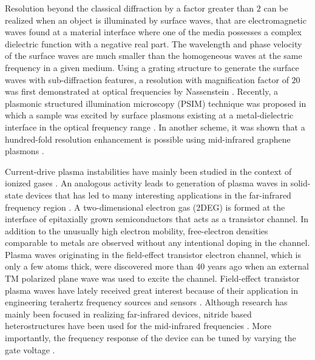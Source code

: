 \documentclass[10pt]{article}
\renewcommand{\^}{\hat}  %
\renewcommand{\^}{\hat}  %
\begin{document}
Resolution beyond the classical diffraction by a factor greater than $2$ can be realized when an object is illuminated by surface waves, that are electromagnetic waves found at a material interface where one of the media possesses a complex dielectric function with a negative real part. The wavelength and phase velocity of the surface waves are much smaller than the homogeneous waves at the same frequency in a given medium. Using a grating structure to generate the surface waves with sub-diffraction features, a resolution with magnification factor of $20$ was first demonstrated at optical frequencies by Nassenstein \cite{Nassenstein1970}. Recently, a plasmonic structured illumination microscopy (PSIM) technique was proposed in which a sample was excited by surface plasmons existing at a metal-dielectric interface in the optical frequency range \cite{Wei2010}. In another scheme, it was shown that a hundred-fold resolution enhancement is possible using mid-infrared
graphene plasmons \cite{Zeng2014,Zeng2017}.

Current-drive plasma instabilities have mainly been studied in the context of ionized gases \cite{9781489947871}.  An analogous activity leads to generation  of plasma waves in solid-state devices \cite{Kempa1991} that has led to many interesting applications in the far-infrared frequency region \cite{Dyer_2016, Wu2015}. A two-dimensional electron gas (2DEG) is formed at the interface of epitaxially grown semiconductors that acts as a transistor channel. In addition to the unusually high electron mobility, free-electron densities comparable to metals are observed without any intentional doping in the channel. Plasma waves originating in the field-effect transistor electron channel, which is only a few atoms thick, were discovered more than 40 years ago \cite{Stern1967a, Allen1977} when an external TM polarized plane wave was used to excite the channel. Field-effect transistor plasma waves have lately received great interest because of their application in engineering terahertz frequency sources and
sensors \cite{Dyakonov1993, Dyakonov1996, Popov2005, Otsuji2006, Dyakonov2005}. Although research has mainly been focused in realizing far-infrared devices, nitride based heterostructures have been used for the mid-infrared frequencies
\cite{Hofstetter2002}. More importantly, the frequency response of the device can be tuned by varying the gate voltage \cite{Fatimy2010, Rabbaa2011}.
\end{document}
